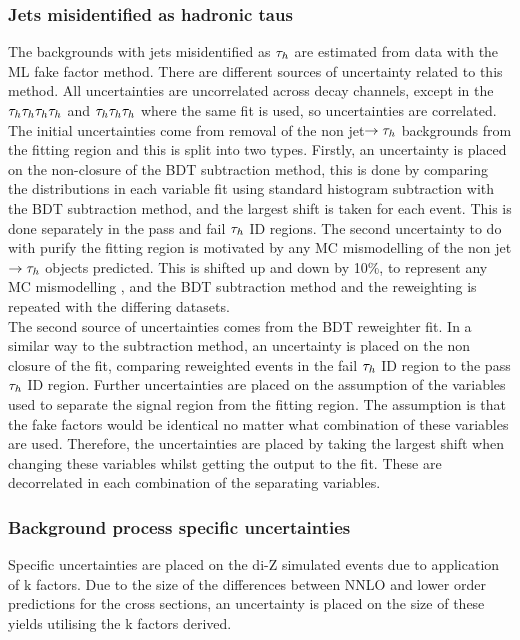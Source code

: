 \subsubsection{Jets misidentified as hadronic taus}
The backgrounds with jets misidentified as $\tau_{h}$ are estimated from data with the ML fake factor method. 
There are different sources of uncertainty related to this method. 
All uncertainties are uncorrelated across decay channels, except in the $\tau_{h}\tau_{h}\tau_{h}\tau_{h}$ and $\tau_{h}\tau_{h}\tau_{h}$ where the same fit is used, so uncertainties are correlated. \\

The initial uncertainties come from removal of the non jet$\rightarrow\tau_{h}$ backgrounds from the fitting region and this is split into two types.
Firstly, an uncertainty is placed on the non-closure of the BDT subtraction method, this is done by comparing the distributions in each variable fit using standard histogram subtraction with the BDT subtraction method, and the largest shift is taken for each event. This is done separately in the pass and fail $\tau_{h}$ ID regions.
The second uncertainty to do with purify the fitting region is motivated by any MC mismodelling of the non jet$\rightarrow\tau_{h}$ objects predicted.
This is shifted up and down by 10\%, to represent any MC mismodelling , and the BDT subtraction method and the reweighting is repeated with the differing datasets. \\

The second source of uncertainties comes from the BDT reweighter fit.
In a similar way to the subtraction method, an uncertainty is placed on the non closure of the fit, comparing reweighted events in the fail $\tau_{h}$ ID region to the pass $\tau_{h}$ ID region.
Further uncertainties are placed on the assumption of the variables used to separate the signal region from the fitting region.
The assumption is that the fake factors would be identical no matter what combination of these variables are used.
Therefore, the uncertainties are placed by taking the largest shift when changing these variables whilst getting the output to the fit.
These are decorrelated in each combination of the separating variables.

\subsubsection{Background process specific uncertainties}
Specific uncertainties are placed on the di-Z simulated events due to application of k factors.
Due to the size of the differences between NNLO and lower order predictions for the cross sections, an uncertainty is placed on the size of these yields utilising the k factors derived.

